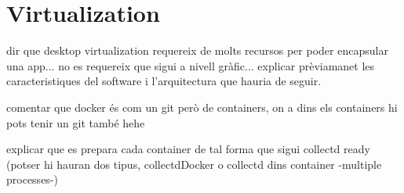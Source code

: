 \chapter{Virtualization}\label{D:virtualization}


dir que desktop virtualization requereix de molts recursos per poder encapsular una app... no es requereix que sigui a nivell gràfic... explicar prèviamanet les caracteristiques del software i l'arquitectura que hauria de seguir.

comentar que docker és com un git però de containers, on a dins els containers hi pots tenir un git també hehe

explicar que es prepara cada container de tal forma que sigui collectd ready (potser hi hauran dos tipus, collectdDocker o collectd dins container -multiple processes-)